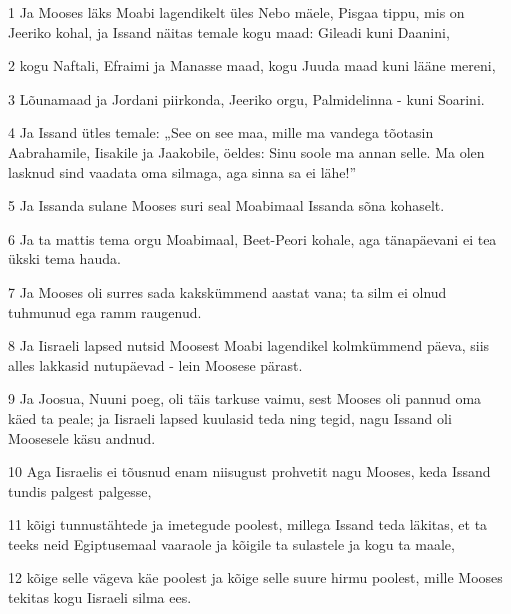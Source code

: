 \par 1 Ja Mooses läks Moabi lagendikelt üles Nebo mäele, Pisgaa tippu, mis on Jeeriko kohal, ja Issand näitas temale kogu maad: Gileadi kuni Daanini,
\par 2 kogu Naftali, Efraimi ja Manasse maad, kogu Juuda maad kuni lääne mereni,
\par 3 Lõunamaad ja Jordani piirkonda, Jeeriko orgu, Palmidelinna - kuni Soarini.
\par 4 Ja Issand ütles temale: „See on see maa, mille ma vandega tõotasin Aabrahamile, Iisakile ja Jaakobile, öeldes: Sinu soole ma annan selle. Ma olen lasknud sind vaadata oma silmaga, aga sinna sa ei lähe!”
\par 5 Ja Issanda sulane Mooses suri seal Moabimaal Issanda sõna kohaselt.
\par 6 Ja ta mattis tema orgu Moabimaal, Beet-Peori kohale, aga tänapäevani ei tea ükski tema hauda.
\par 7 Ja Mooses oli surres sada kakskümmend aastat vana; ta silm ei olnud tuhmunud ega ramm raugenud.
\par 8 Ja Iisraeli lapsed nutsid Moosest Moabi lagendikel kolmkümmend päeva, siis alles lakkasid nutupäevad - lein Moosese pärast.
\par 9 Ja Joosua, Nuuni poeg, oli täis tarkuse vaimu, sest Mooses oli pannud oma käed ta peale; ja Iisraeli lapsed kuulasid teda ning tegid, nagu Issand oli Moosesele käsu andnud.
\par 10 Aga Iisraelis ei tõusnud enam niisugust prohvetit nagu Mooses, keda Issand tundis palgest palgesse,
\par 11 kõigi tunnustähtede ja imetegude poolest, millega Issand teda läkitas, et ta teeks neid Egiptusemaal vaaraole ja kõigile ta sulastele ja kogu ta maale,
\par 12 kõige selle vägeva käe poolest ja kõige selle suure hirmu poolest, mille Mooses tekitas kogu Iisraeli silma ees.

